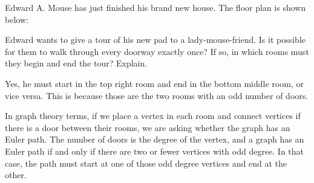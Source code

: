 \documentclass[11pt]{exam}
\begin{document}
\begin{questions}
%
%
%
%


\question Edward A. Mouse has just finished his brand new house.  The floor plan is shown below:

\begin{center}
\end{center}


Edward wants to give a tour of his new pad to a lady-mouse-friend.  Is it possible for them to walk through every doorway exactly once?  If so, in which rooms must they begin and end the tour? Explain.
 \begin{solution}
   Yes, he must start in the top right room and end in the bottom middle room, or vice versa.  This is because those are the two rooms with an odd number of doors.

   In graph theory terms, if we place a vertex in each room and connect vertices if there is a door between their rooms, we are asking whether the graph has an Euler path.  The number of doors is the degree of the vertex, and a graph has an Euler path if and only if there are two or fewer vertices with odd degree.  In that case, the path must start at one of those odd degree vertices and end at the other.
 \end{solution}
\end{questions}
\end{document}
